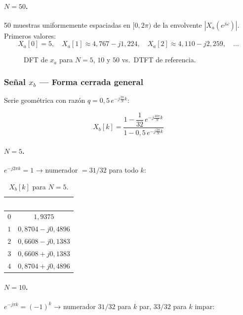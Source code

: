 \documentclass[../Main_Include.tex]{subfiles}
\begin{document}
\paragraph{$N = 50$.}
50 muestras uniformemente espaciadas en $[0, 2\pi)$ de la envolvente
$|X_a(e^{j\omega})|$. Primeros valores:
\[
    X_a[0] = 5, \quad
    X_a[1] \approx 4{,}767 - j1{,}224, \quad
    X_a[2] \approx 4{,}110 - j2{,}259, \quad \dots
\]

\begin{figure}[H]
    \centering
    \caption{DFT de $x_a$ para $N = 5$, $10$ y $50$ vs.\ DTFT de referencia.}
\end{figure}

\subsubsection*{Señal $x_b$ — Forma cerrada general}

Serie geométrica con razón $q = 0{,}5\,e^{-j\frac{2\pi}{N}k}$:

\[
    \boxed{X_b[k] = \frac{1 - \dfrac{1}{32}\,e^{-j\frac{10\pi}{N}k}}
                        {1 - 0{,}5\,e^{-j\frac{2\pi}{N}k}}}
\]

\paragraph{$N = 5$.}
$e^{-j2\pi k} = 1$ → numerador $= 31/32$ para todo $k$:

\begin{table}[H]
\centering
\renewcommand{\arraystretch}{1.4}
\begin{tabular}{cc}
\toprule
\rowcolor{azulprinc}
\textcolor{white}{\textbf{$k$}} &
\textcolor{white}{\textbf{$X_b[k]$}} \\
\midrule
\rowcolor{grisclaro}
$0$ & $1{,}9375$ \\
$1$ & $0{,}8704 - j0{,}4896$ \\
\rowcolor{grisclaro}
$2$ & $0{,}6608 - j0{,}1383$ \\
$3$ & $0{,}6608 + j0{,}1383$ \\
\rowcolor{grisclaro}
$4$ & $0{,}8704 + j0{,}4896$ \\
\bottomrule
\end{tabular}
\caption{$X_b[k]$ para $N = 5$.}
\end{table}

\paragraph{$N = 10$.}
$e^{-j\pi k} = (-1)^k$ → numerador $31/32$ para $k$ par, $33/32$ para $k$ impar:
\end{document}
